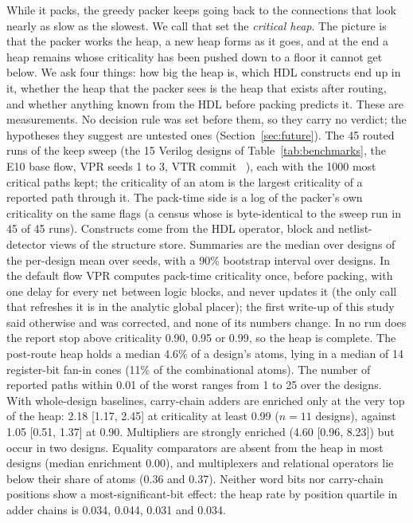  While it packs, the greedy packer keeps going back to the connections that look nearly as slow as the slowest. We call that set the \emph{critical heap}. The picture is that the packer works the heap, a new heap forms as it goes, and at the end a heap remains whose criticality has been pushed down to a floor it cannot get below. We ask four things: how big the heap is, which HDL constructs end up in it, whether the heap that the packer sees is the heap that exists after routing, and whether anything known from the HDL before packing predicts it. These are measurements. No decision rule was set before them, so they carry no verdict; the hypotheses they suggest are untested ones (Section~\ref{sec:future}).
 The 45 routed runs of the keep sweep (the 15 Verilog designs of Table~\ref{tab:benchmarks}, the E10 base flow, VPR seeds 1 to 3, VTR commit ~\cite{rose2012vtr,elgammal2025vtr9}), each with the 1000 most critical paths kept; the criticality of an atom is the largest criticality of a reported path through it. The pack-time side is a log of the packer's own criticality on the same flags (a census whose  is byte-identical to the sweep run in 45 of 45 runs). Constructs come from the HDL operator, block and netlist-detector views of the structure store. Summaries are the median over designs of the per-design mean over seeds, with a 90\% bootstrap interval over designs. In the default flow VPR computes pack-time criticality once, before packing, with one delay for every net between logic blocks, and never updates it (the only call that refreshes it is in the analytic global placer); the first write-up of this study said otherwise and was corrected, and none of its numbers change.
 In no run does the report stop above criticality 0.90, 0.95 or 0.99, so the heap is complete. The post-route heap holds a median 4.6\% of a design's atoms, lying in a median of 14 register-bit fan-in cones (11\% of the combinational atoms). The number of reported paths within 0.01 of the worst ranges from 1 to 25 over the designs.
 With whole-design baselines, carry-chain adders are enriched only at the very top of the heap: 2.18 [1.17, 2.45] at criticality at least 0.99 ($n=11$ designs), against 1.05 [0.51, 1.37] at 0.90. Multipliers are strongly enriched (4.60 [0.96, 8.23]) but occur in two designs. Equality comparators are absent from the heap in most designs (median enrichment 0.00), and multiplexers and relational operators lie below their share of atoms (0.36 and 0.37). Neither word bits nor carry-chain positions show a most-significant-bit effect: the heap rate by position quartile in adder chains is 0.034, 0.044, 0.031 and 0.034.
